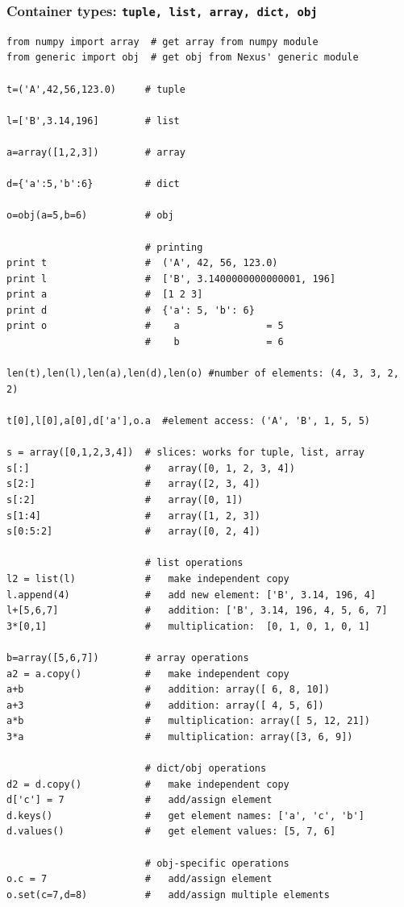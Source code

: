 \subsubsection{Container types: \texttt{tuple, list, array, dict, obj}}
\begin{shaded}
\begin{verbatim}
from numpy import array  # get array from numpy module
from generic import obj  # get obj from Nexus' generic module 

t=('A',42,56,123.0)     # tuple

l=['B',3.14,196]        # list

a=array([1,2,3])        # array

d={'a':5,'b':6}         # dict

o=obj(a=5,b=6)          # obj

                        # printing
print t                 #  ('A', 42, 56, 123.0)
print l                 #  ['B', 3.1400000000000001, 196]
print a                 #  [1 2 3]
print d                 #  {'a': 5, 'b': 6}
print o                 #    a               = 5
                        #    b               = 6

len(t),len(l),len(a),len(d),len(o) #number of elements: (4, 3, 3, 2, 2)

t[0],l[0],a[0],d['a'],o.a  #element access: ('A', 'B', 1, 5, 5)

s = array([0,1,2,3,4])  # slices: works for tuple, list, array
s[:]                    #   array([0, 1, 2, 3, 4])
s[2:]                   #   array([2, 3, 4])
s[:2]                   #   array([0, 1])
s[1:4]                  #   array([1, 2, 3])
s[0:5:2]                #   array([0, 2, 4])

                        # list operations
l2 = list(l)            #   make independent copy
l.append(4)             #   add new element: ['B', 3.14, 196, 4]
l+[5,6,7]               #   addition: ['B', 3.14, 196, 4, 5, 6, 7]
3*[0,1]                 #   multiplication:  [0, 1, 0, 1, 0, 1]

b=array([5,6,7])        # array operations
a2 = a.copy()           #   make independent copy
a+b                     #   addition: array([ 6, 8, 10])
a+3                     #   addition: array([ 4, 5, 6])
a*b                     #   multiplication: array([ 5, 12, 21])
3*a                     #   multiplication: array([3, 6, 9])

                        # dict/obj operations
d2 = d.copy()           #   make independent copy
d['c'] = 7              #   add/assign element 
d.keys()                #   get element names: ['a', 'c', 'b']
d.values()              #   get element values: [5, 7, 6]

                        # obj-specific operations
o.c = 7                 #   add/assign element
o.set(c=7,d=8)          #   add/assign multiple elements

\end{verbatim}
\end{shaded}

